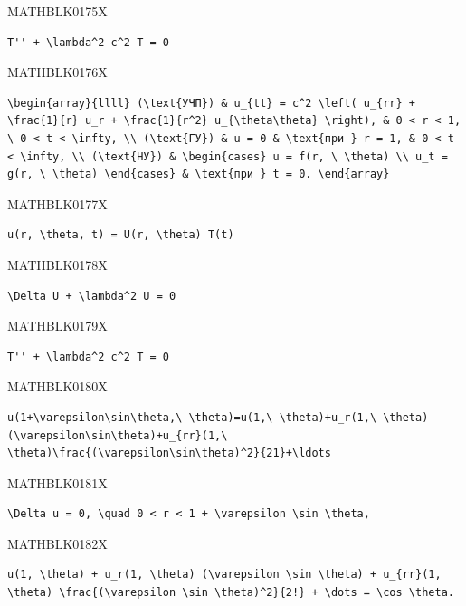 \documentclass[
  ukrainian,
]{article}
\begin{document}
MATHBLK0175X

\begin{verbatim}
T'' + \lambda^2 c^2 T = 0
\end{verbatim}

MATHBLK0176X

\begin{verbatim}
\begin{array}{llll} (\text{УЧП}) & u_{tt} = c^2 \left( u_{rr} + \frac{1}{r} u_r + \frac{1}{r^2} u_{\theta\theta} \right), & 0 < r < 1, \ 0 < t < \infty, \\ (\text{ГУ}) & u = 0 & \text{при } r = 1, & 0 < t < \infty, \\ (\text{НУ}) & \begin{cases} u = f(r, \ \theta) \\ u_t = g(r, \ \theta) \end{cases} & \text{при } t = 0. \end{array}
\end{verbatim}

MATHBLK0177X

\begin{verbatim}
u(r, \theta, t) = U(r, \theta) T(t)
\end{verbatim}

MATHBLK0178X

\begin{verbatim}
\Delta U + \lambda^2 U = 0
\end{verbatim}

MATHBLK0179X

\begin{verbatim}
T'' + \lambda^2 c^2 T = 0
\end{verbatim}

MATHBLK0180X

\begin{verbatim}
u(1+\varepsilon\sin\theta,\ \theta)=u(1,\ \theta)+u_r(1,\ \theta)(\varepsilon\sin\theta)+u_{rr}(1,\ \theta)\frac{(\varepsilon\sin\theta)^2}{21}+\ldots
\end{verbatim}

MATHBLK0181X

\begin{verbatim}
\Delta u = 0, \quad 0 < r < 1 + \varepsilon \sin \theta,
\end{verbatim}

MATHBLK0182X

\begin{verbatim}
u(1, \theta) + u_r(1, \theta) (\varepsilon \sin \theta) + u_{rr}(1, \theta) \frac{(\varepsilon \sin \theta)^2}{2!} + \dots = \cos \theta.
\end{verbatim}
\end{document}
